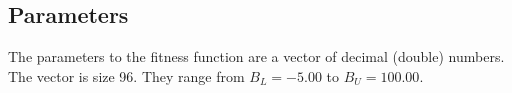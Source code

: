 \subsection{Parameters}
The parameters to the fitness function are a vector of decimal (double)
numbers. The vector is size 96. They range from $ B_L = -5.00 $ to 
$ B_U = 100.00 $.

